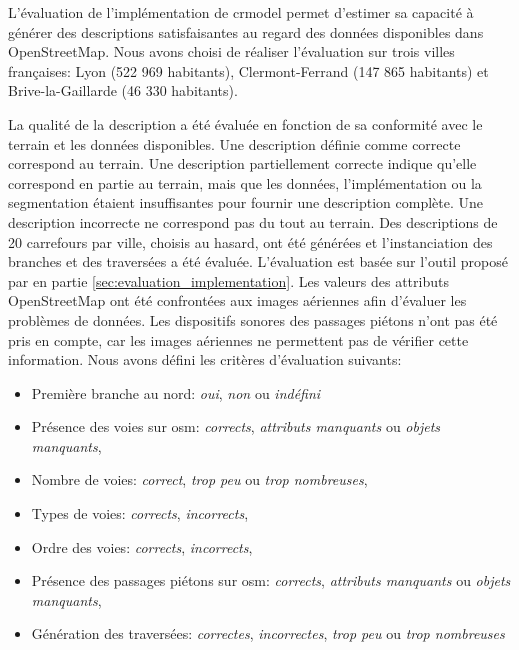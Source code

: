 L'évaluation de l'implémentation de crmodel permet d'estimer sa capacité à générer des descriptions satisfaisantes au regard des données disponibles dans OpenStreetMap. Nous avons choisi de réaliser l'évaluation sur trois villes françaises: Lyon (522 969 habitants), Clermont-Ferrand (147 865 habitants) et Brive-la-Gaillarde (46 330 habitants).

\newpar{}

La qualité de la description a été évaluée en fonction de sa conformité avec le terrain et les données disponibles. Une description définie comme correcte correspond au terrain. Une description partiellement correcte indique qu'elle correspond en partie au terrain, mais que les données, l'implémentation ou la segmentation étaient insuffisantes pour fournir une description complète. Une description incorrecte ne correspond pas du tout au terrain. Des descriptions de 20 carrefours par ville, choisis au hasard, ont été générées et l'instanciation des branches et des traversées a été évaluée. L'évaluation est basée sur l'outil proposé par en partie \ref{sec:evaluation_implementation}. Les valeurs des attributs OpenStreetMap ont été confrontées aux images aériennes afin d'évaluer les problèmes de données. Les dispositifs sonores des passages piétons n'ont pas été pris en compte, car les images aériennes ne permettent pas de vérifier cette information. Nous avons défini les critères d’évaluation suivants:
\begin{itemize}
    \item Première branche au nord: \textit{oui}, \textit{non} ou \textit{indéfini}
    \item Présence des voies sur \gls{osm}: \textit{corrects}, \textit{attributs manquants} ou \textit{objets manquants},
    \item Nombre de voies: \textit{correct}, \textit{trop peu} ou \textit{trop nombreuses},
    \item Types de voies: \textit{corrects}, \textit{incorrects},
    \item Ordre des voies: \textit{corrects}, \textit{incorrects},
    \item Présence des passages piétons sur \gls{osm}: \textit{corrects}, \textit{attributs manquants} ou \textit{objets manquants},
    \item Génération des traversées: \textit{correctes}, \textit{incorrectes}, \textit{trop peu} ou \textit{trop nombreuses}
\end{itemize}

\newpar{}

